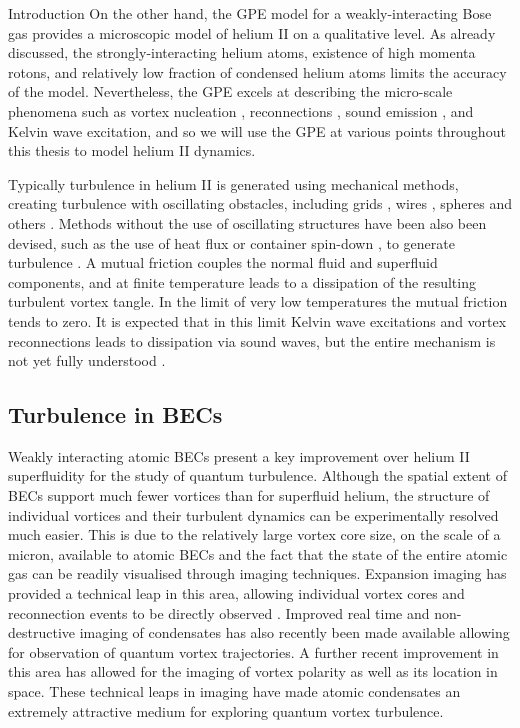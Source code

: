 \begin{chapter}{\label{cha:bose_gases}Introduction}
On the other hand, the GPE model for a weakly-interacting Bose gas provides a microscopic model of helium II on a qualitative level. As already discussed, the strongly-interacting helium atoms, existence of high momenta rotons, and relatively low fraction of condensed helium atoms limits the accuracy of the model. Nevertheless, the GPE excels at describing the micro-scale phenomena such as vortex nucleation \cite{frisch92}, reconnections \cite{PhysRevLett.71.1375, PhysRevLett.76.4745}, sound emission \cite{leadbeater,PhysRevA.69.053601}, and Kelvin wave excitation, and so we will use the GPE at various points throughout this thesis to model helium II dynamics.

Typically turbulence in helium II is generated using mechanical methods, creating turbulence with oscillating obstacles, including grids \cite{Davis2000}, wires \cite{Guenault1986,Bradley2011,Fisher2001}, spheres \cite{Schoepe1995} and others \cite{Blaauwgeers2007,Bradley2012,Tabeling1998,Salort,VinenSkrbek2008}. Methods without the use of oscillating structures have been also been devised, such as the use of heat flux \cite{Vinen114} or container spin-down \cite{PhysRevLett.99.265302}, to generate turbulence . A mutual friction \cite{Donnelly} couples the normal fluid and superfluid components, and at finite temperature leads to a dissipation of the resulting turbulent vortex tangle. In the limit of very low temperatures the mutual friction tends to zero. It is expected that in this limit Kelvin wave excitations \cite{leadbeater,PhysRevA.69.053601} and vortex reconnections leads to dissipation via sound waves, but the entire mechanism is not yet fully understood \cite{PhysRevB.61.1410}.

\subsection{Turbulence in BECs}

Weakly interacting atomic BECs present a key improvement over helium II superfluidity for the study of quantum turbulence. Although the spatial extent of BECs support much fewer vortices than for superfluid helium, the structure of individual vortices and their turbulent dynamics can be experimentally resolved much easier. This is due to the relatively large vortex core size, on the scale of a micron, available to atomic BECs and the fact that the state of the entire atomic gas can be readily visualised through imaging techniques. Expansion imaging has provided a technical leap in this area, allowing individual vortex cores and reconnection events to be directly observed \cite{PhysRevLett.84.806,Raman01,kwon_moon_14}. Improved real time and non-destructive imaging of condensates has also recently been made available \cite{Freilich2010} allowing for observation of quantum vortex trajectories. A further recent improvement in this area \cite{powis} has allowed for the imaging of vortex polarity as well as its location in space. These technical leaps in imaging have made atomic condensates an extremely attractive medium for exploring quantum vortex turbulence. 


\end{chapter}
